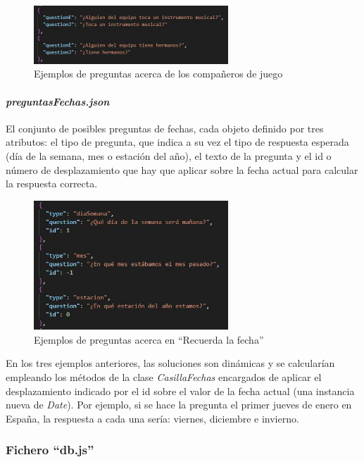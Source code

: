 \begin{figure}[H]
	\centering
	\includegraphics[width=0.65\textwidth]{imgs/exp-compas.jpg}
	\caption{Ejemplos de preguntas acerca de los compañeros de juego}
	\label{fig:exp-compas}
\end{figure}

\paragraph{\textit{preguntasFechas.json}}

El conjunto de posibles preguntas de fechas, cada objeto definido por tres atributos: el tipo de pregunta, que indica a su vez el tipo de respuesta esperada (día de la semana, mes o estación del año), el texto de la pregunta y el id o número de desplazamiento que hay que aplicar sobre la fecha actual para calcular la respuesta correcta.

\begin{figure}[H]
	\centering
	\includegraphics[width=0.65\textwidth]{imgs/exp-fechas.jpg}
	\caption{Ejemplos de preguntas acerca en \enquote{Recuerda la fecha}}
	\label{fig:exp-fechas}
\end{figure}

En los tres ejemplos anteriores, las soluciones son dinámicas y se calcularían empleando los métodos de la clase \textit{CasillaFechas} encargados de aplicar el desplazamiento indicado por el id sobre el valor de la fecha actual (una instancia nueva de \textit{Date}). Por ejemplo, si se hace la pregunta el primer jueves de enero en España, la respuesta a cada una sería: viernes, diciembre e invierno.

\subsubsection{Fichero \enquote{db.js}}

